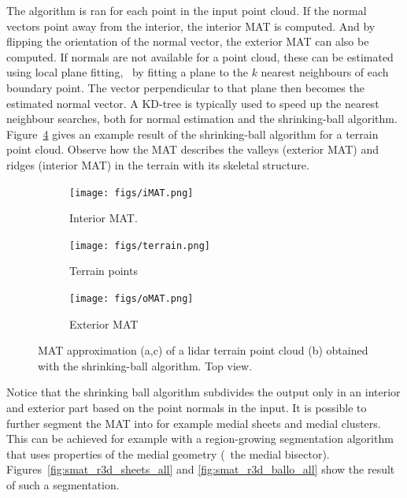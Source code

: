 The algorithm is ran for each point in the input point cloud. 
If the normal vectors point away from the interior, the interior MAT is computed.
And by flipping the orientation of the normal vector, the exterior MAT can also be computed.
If normals are not available for a point cloud, these can be estimated using local plane fitting, \ie\ by fitting a plane to the $k$ nearest neighbours of each boundary point. 
The vector perpendicular to that plane then becomes the estimated normal vector.
A KD-tree is typically used to speed up the nearest neighbour searches, both for normal estimation and the shrinking-ball algorithm.
Figure~\ref{fig:ca_ridge} gives an example result of the shrinking-ball algorithm for a terrain point cloud. 
Observe how the MAT describes the valleys (exterior MAT) and ridges (interior MAT) in the terrain with its skeletal structure.
\begin{figure}
	\centering
	\begin{subfigure}{0.310\linewidth}
		\texttt{[image: figs/iMAT.png]}
		\caption{Interior MAT.}
		\label{fig:ca_ridge:imat}
	\end{subfigure}
	\begin{subfigure}{0.310\linewidth}
		\texttt{[image: figs/terrain.png]}
		\caption{Terrain points}
		\label{fig:ca_ridge:terrain}
	\end{subfigure}
	\begin{subfigure}{0.310\linewidth}
		\texttt{[image: figs/oMAT.png]}
		\caption{Exterior MAT}
		\label{fig:ca_ridge:omat}
	\end{subfigure}
	\caption{MAT approximation (a,c) of a lidar terrain point cloud (b) obtained with the shrinking-ball algorithm. Top view.}
	\label{fig:ca_ridge}
\end{figure}

Notice that the shrinking ball algorithm subdivides the output only in an interior and exterior part based on the point normals in the input. 
It is possible to further segment the MAT into for example medial sheets and medial clusters.
This can be achieved for example with a region-growing segmentation algorithm that uses properties of the medial geometry (\eg\ the medial bisector). 
Figures~\ref{fig:smat_r3d_sheets_all} and \ref{fig:smat_r3d_ballo_all} show the result of such a segmentation.

